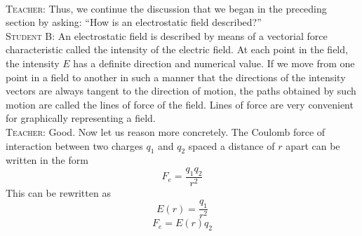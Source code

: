 \documentclass[a4paper,sfsidenotes]{tufte-book}
\begin{document}
\paragraph{}
\textsc{Teacher:} Thus, we continue the discussion that we began in the preceding section by asking: ``How is an electrostatic field described?''
\\
\textsc{Student B:} An electrostatic field is described by means of a vectorial force characteristic called the intensity of the electric field. At each point in the field, the intensity $E$ has a definite direction and numerical value. If we move from one point in a field to another in such a manner that the directions of the intensity vectors are always tangent to the direction of motion, the paths obtained by such motion are called the lines of force of the field. Lines of force are very convenient for graphically representing a field.
\\
\textsc{Teacher:} Good. Now let us reason more concretely. The Coulomb force of interaction between two charges $q_{1}$ and $q_{2}$ spaced a distance of $r$ apart can be written in the form
\begin{equation}%
F_{e} = \frac{q_{1} q_{2}}{r^{2}} 
\label{127}
\end{equation}
This can be rewritten as
\begin{equation}%
E(r) =  \dfrac{q_{1}}{r^{2}}
\label{128}
\end{equation}
\begin{equation}%
F_{e} = E(r) q_{2}
\label{129}
\end{equation}
\end{document}

